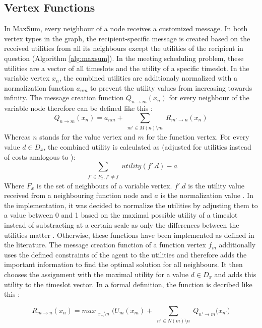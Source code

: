 \subsection{Vertex Functions} 
In MaxSum, every neighbour of a node receives a customized message. In both vertex types in the graph, the recipient-specific message is created based on the received utilities from all its neighbours except the utilities of the recipient in question (Algorithm \ref{alg:maxsum}). In the meeting scheduling problem, these utilities are a vector of all timeslots and the utility of a specific timeslot.
In the variable vertex \(x_{n}\), the combined utilities are additionaly normalized with a normalization function \(a_{nm}\) to prevent the utility values from increasing towards infinity. The message creation function \(Q_{n \rightarrow m}(x_{n})\) for every neighbour of the variable node therefore can be defined like this \cite{Farinelli2008}:
\[Q_{n \rightarrow  m}(x_{n}) = a_{nm} + \sum_{\substack{m' \in M (n) \setminus  m }} R_{m' \rightarrow n} (x_{n}) \]
Whereas \(n\) stands for the value vertex and \(m\) for the function vertex. For every value \(d \in D_{x}\), the combined utility is calculated as (adjusted for utilities instead of costs analogous to \cite{Zivan2012}):
\[\sum_{\substack{f' \in F_{x}, f' \neq f}}  utility(f'.d ) -a \]
Where \(F_{x}\) is the set of neighbours of a variable vertex. \(f'.d\) is the utility value received from a neighbouring function node and \(a\) is the normalization value . In the implementation, it was decided to normalize the utilities by adjusting them to a value between 0 and 1 based on the maximal possible utility of a timeslot instead of substracting at a certain scale as only the differences between the utilities matter \cite{Zivan2012}. Otherwise, these functions have been implemented as defined in the literature.
The message creation function of a function vertex \(f_{m}\) additionally uses the defined constraints of the agent to the utilities and therefore adds the important information to find the optimal solution for all neighbours. It then chooses the assignment with the maximal utility for a value \(d \in D_{x}\) and adds this utility to the timeslot vector. In a formal definition, the function is decribed like this \cite{Farinelli2008}: 

\[R_{m \rightarrow  n}(x_{n}) = max_{\substack{x_{m} \setminus n}} \bigg( U_{m}(x_{m}) + \sum_{\substack{n' \in N (m) \setminus n }} Q_{n' \rightarrow m} (x_{n'} \bigg) \]

